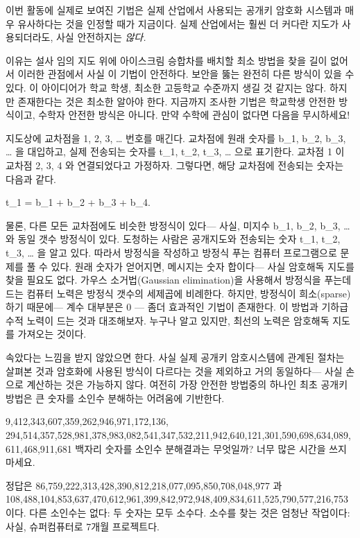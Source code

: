 \documentclass[]{article}
\begin{document}
이번 활동에 실제로 보여진 기법은 실제 산업에서 사용되는 공개키 암호화
시스템과 매우 유사하다는 것을 인정할 때가 지금이다. 실제 산업에서는 훨씬
더 커다란 지도가 사용되더라도, 사실 안전하지는 \emph{않다.}

이유는 설사 임의 지도 위에 아이스크림 승합차를 배치할 최소 방법을 찾을
길이 없어서 이러한 관점에서 사실 이 기법이 안전하다. 보안을 뚫는 완전히
다른 방식이 있을 수 있다. 이 아이디어가 학교 학생, 최소한 고등학교
수준까지 생길 것 같지는 않다. 하지만 존재한다는 것은 최소한 알아야 한다.
지금까지 조사한 기법은 학교학생 안전한 방식이고, 수학자 안전한 방식은
아니다. 만약 수학에 관심이 없다면 다음을 무시하세요!

지도상에 교차점을 1, 2, 3, \ldots{} 번호를 매긴다. 교차점에 원래 숫자를
b\_1, b\_2, b\_3, \ldots{} 을 대입하고, 실제 전송되는 숫자를 t\_1, t\_2,
t\_3, \ldots{} 으로 표기한다. 교차점 1 이 교차점 2, 3, 4 와 연결되었다고
가정하자. 그렇다면, 해당 교차점에 전송되는 숫자는 다음과 같다.

t\_1 = b\_1 + b\_2 + b\_3 + b\_4.

물론, 다른 모든 교차점에도 비슷한 방정식이 있다--- 사실, 미지수 b\_1,
b\_2, b\_3, \ldots{} 와 동일 갯수 방정식이 있다. 도청하는 사람은
공개지도와 전송되는 숫자 t\_1, t\_2, t\_3, \ldots{} 을 알고 있다. 따라서
방정식을 작성하고 방정식 푸는 컴퓨터 프로그램으로 문제를 풀 수 있다.
원래 숫자가 얻어지면, 메시지는 숫자 합이다--- 사실 암호해독 지도를 찾을
필요도 없다. 가우스 소거법(Gaussian elimination)을 사용해서 방정식을
푸는데 드는 컴퓨터 노력은 방정식 갯수의 세제곱에 비례한다. 하지만,
방정식이 희소(sparse)하기 때문에--- 계수 대부분은 0 --- 좀더 효과적인
기법이 존재한다. 이 방법과 기하급수적 노력이 드는 것과 대조해보자.
누구나 알고 있지만, 최선의 노력은 암호해독 지도를 가져오는 것이다.

속았다는 느낌을 받지 않았으면 한다. 사실 실제 공개키 암호시스템에 관계된
절차는 살펴본 것과 암호화에 사용된 방식이 다르다는 것을 제외하고 거의
동일하다--- 사실 손으로 계산하는 것은 가능하지 않다. 여전히 가장 안전한
방법중의 하나인 최초 공개키 방법은 큰 숫자를 소인수 분해하는 어려움에
기반한다.

9,412,343,607,359,262,946,971,172,136,
294,514,357,528,981,378,983,082,541,347,532,211,942,640,121,301,590,698,634,089,
611,468,911,681 백자리 숫자를 소인수 분해결과는 무엇일까? 너무 많은
시간을 쓰지 마세요.

정답은 86,759,222,313,428,390,812,218,077,095,850,708,048,977 과
108,488,104,853,637,470,612,961,399,842,972,948,409,834,611,525,790,577,216,753
이다. 다른 소인수는 없다: 두 숫자는 모두 소수다. 소수를 찾는 것은 엄청난
작업이다: 사실, 슈퍼컴퓨터로 7개월 프로젝트다.
\end{document}
